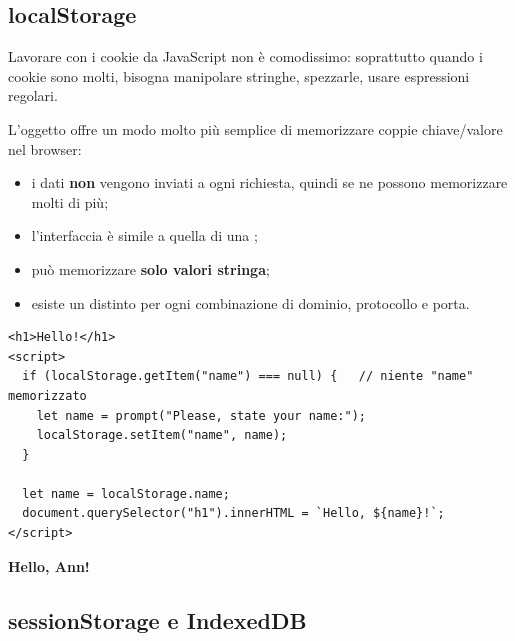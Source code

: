 \subsection{localStorage}

Lavorare con i cookie da JavaScript non è comodissimo: soprattutto quando i
cookie sono molti, bisogna manipolare stringhe, spezzarle, usare espressioni
regolari.

L'oggetto  offre un modo molto più semplice di memorizzare
coppie chiave/valore nel browser:

\begin{itemize}
  \item i dati \textbf{non} vengono inviati a ogni richiesta, quindi se ne
        possono memorizzare molti di più;
  \item l'interfaccia è simile a quella di una ;
  \item può memorizzare \textbf{solo valori stringa};
  \item esiste un  distinto per ogni combinazione di dominio,
        protocollo e porta.
\end{itemize}

\begin{affianco}[0.6][c]
\codicepiccolo
\begin{lstlisting}[style=html, name=localstorage.html]
<h1>Hello!</h1>
<script>
  if (localStorage.getItem("name") === null) {   // niente "name" memorizzato
    let name = prompt("Please, state your name:");
    localStorage.setItem("name", name);
  }

  let name = localStorage.name;
  document.querySelector("h1").innerHTML = `Hello, ${name}!`;
</script>
\end{lstlisting}
\risultato
\begin{browser}
  {\Lora\bfseries\Huge Hello, Ann!}
\end{browser}
\begin{immagine}
\end{immagine}
\end{affianco}

\subsection{sessionStorage e IndexedDB}

